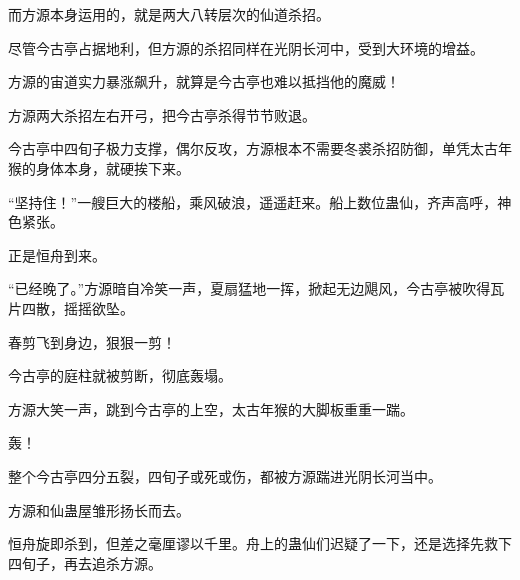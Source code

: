 \begin{this_body}
而方源本身运用的，就是两大八转层次的仙道杀招。

尽管今古亭占据地利，但方源的杀招同样在光阴长河中，受到大环境的增益。

方源的宙道实力暴涨飙升，就算是今古亭也难以抵挡他的魔威！

方源两大杀招左右开弓，把今古亭杀得节节败退。

今古亭中四旬子极力支撑，偶尔反攻，方源根本不需要冬裘杀招防御，单凭太古年猴的身体本身，就硬挨下来。

“坚持住！”一艘巨大的楼船，乘风破浪，遥遥赶来。船上数位蛊仙，齐声高呼，神色紧张。

正是恒舟到来。

“已经晚了。”方源暗自冷笑一声，夏扇猛地一挥，掀起无边飓风，今古亭被吹得瓦片四散，摇摇欲坠。

春剪飞到身边，狠狠一剪！

今古亭的庭柱就被剪断，彻底轰塌。

方源大笑一声，跳到今古亭的上空，太古年猴的大脚板重重一踹。

轰！

整个今古亭四分五裂，四旬子或死或伤，都被方源踹进光阴长河当中。

方源和仙蛊屋雏形扬长而去。

恒舟旋即杀到，但差之毫厘谬以千里。舟上的蛊仙们迟疑了一下，还是选择先救下四旬子，再去追杀方源。

\end{this_body}

